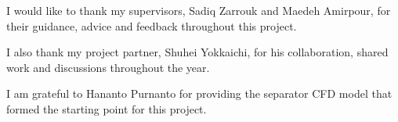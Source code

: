 I would like to thank my supervisors, Sadiq Zarrouk and Maedeh Amirpour, for their guidance, advice and feedback throughout this project.

I also thank my project partner, Shuhei Yokkaichi, for his collaboration, shared work and discussions throughout the year.

I am grateful to Hananto Purnanto for providing the separator CFD model that formed the starting point for this project.
